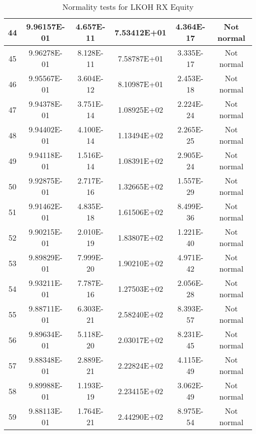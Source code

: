 \begin{table}[h]
\begin{tabular}{|c|c|c|c|c|c|}
		44 & 9.96157E-01 & 4.657E-11 & 7.53412E+01 & 4.364E-17 & Not normal\\\hline
		45 & 9.96278E-01 & 8.128E-11 & 7.58787E+01 & 3.335E-17 & Not normal\\\hline
		46 & 9.95567E-01 & 3.604E-12 & 8.10987E+01 & 2.453E-18 & Not normal\\\hline
		47 & 9.94378E-01 & 3.751E-14 & 1.08925E+02 & 2.224E-24 & Not normal\\\hline
		48 & 9.94402E-01 & 4.100E-14 & 1.13494E+02 & 2.265E-25 & Not normal\\\hline
		49 & 9.94118E-01 & 1.516E-14 & 1.08391E+02 & 2.905E-24 & Not normal\\\hline
		50 & 9.92875E-01 & 2.717E-16 & 1.32665E+02 & 1.557E-29 & Not normal\\\hline
		51 & 9.91462E-01 & 4.835E-18 & 1.61506E+02 & 8.499E-36 & Not normal\\\hline
		52 & 9.90215E-01 & 2.010E-19 & 1.83807E+02 & 1.221E-40 & Not normal\\\hline
		53 & 9.89829E-01 & 7.999E-20 & 1.90210E+02 & 4.971E-42 & Not normal\\\hline
		54 & 9.93211E-01 & 7.787E-16 & 1.27503E+02 & 2.056E-28 & Not normal\\\hline
		55 & 9.88711E-01 & 6.303E-21 & 2.58240E+02 & 8.393E-57 & Not normal\\\hline
		56 & 9.89634E-01 & 5.118E-20 & 2.03017E+02 & 8.231E-45 & Not normal\\\hline
		57 & 9.88348E-01 & 2.889E-21 & 2.22824E+02 & 4.115E-49 & Not normal\\\hline
		58 & 9.89988E-01 & 1.193E-19 & 2.23415E+02 & 3.062E-49 & Not normal\\\hline
		59 & 9.88113E-01 & 1.764E-21 & 2.44290E+02 & 8.975E-54 & Not normal\\\hline
	\end{tabular}
	\caption{Normality tests for LKOH RX Equity}
	\label{tab:normality_tests_LKOH_RX}
\end{table}
